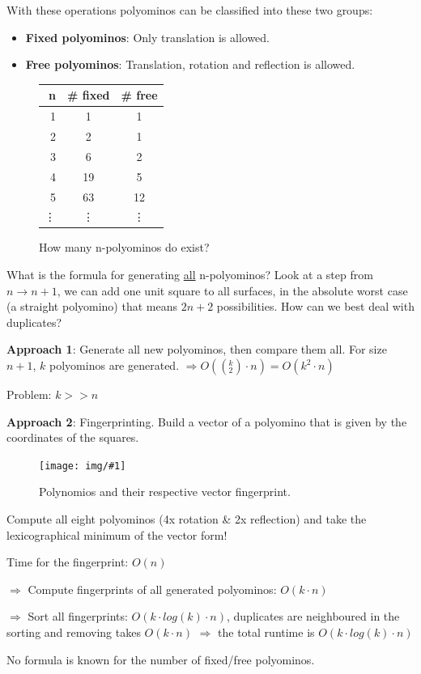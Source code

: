 \documentclass[12pt,onecolumn%
]{scrartcl}
\newcommand{\img}[3]{
\begin{figure}[H]
	\centering
	\texttt{[image: img/\#1]}
	\captionsetup{width=0.8\textwidth, justification=centering}
	\caption{#3}
\end{figure}
}
\newcommand{\fig}[2]{
\begin{figure}[H]
	\centering
	#1
	\captionsetup{width=0.8\textwidth, justification=centering}
	\caption{#2}
\end{figure}
}
\begin{document}
With these operations polyominos can be classified into these two groups: 
\begin{itemize}
	\item {\bf Fixed polyominos}: Only translation is allowed.
	\item {\bf Free polyominos}: Translation, rotation and reflection is allowed.	
\end{itemize}

\fig{
\begin{tabular}{| r | c | c |}
  \hline
  n & \# fixed & \# free \\
  \hline	
  1 & 1 & 1 \\
  2 & 2 & 1 \\
  3 & 6 & 2 \\
  4 & 19 & 5 \\
  5 & 63 & 12 \\
  \vdots & \vdots & \vdots 
\end{tabular}}{How many n-polyominos do exist?}

What is the formula for generating \underline{all} n-polyominos? Look at a step from $n \to n+1$, we can add one unit square to all surfaces, in the absolute worst case (a straight polyomino) that means $2n+2$ possibilities. How can we best deal with duplicates?

{\bf Approach 1}: Generate all new polyominos, then compare them all. For size $n+1$, $k$ polyominos are generated. $\Rightarrow O((_2^k) \cdot n) = O(k^2 \cdot n)$ 

Problem: $k >> n$

{\bf Approach 2}: Fingerprinting. Build a vector of a polyomino that is given by the coordinates of the squares.

\img{polyominos_vector}
	{scale=1, trim=275 505 360 125}
	{Polynomios and their respective vector fingerprint.}
	
Compute all eight polyominos (4x rotation \& 2x reflection) and take the lexicographical minimum of the vector form!

Time for the fingerprint: $O(n)$

$\Rightarrow$ Compute fingerprints of all generated polyominos: $O(k \cdot n)$

$\Rightarrow$ Sort all fingerprints: $O(k \cdot log(k) \cdot n)$, duplicates are neighboured in the sorting and removing takes $O(k \cdot n)$
$\Rightarrow$ the total runtime is $O(k \cdot log(k) \cdot n)$

No formula is known for the number of fixed/free polyominos.
\end{document}
